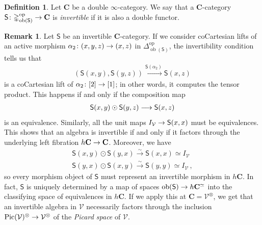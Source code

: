 \documentclass[10pt]{amsart}
\numberwithin{equation}{section}
\theoremstyle{definition}
\newtheorem{definition}[prop]{Definition}
\newtheorem{rem}[prop]{Remark}
\DeclareMathOperator{\Pic}{Pic}
\DeclareMathOperator{\ob}{ob}
\DeclareMathOperator{\op}{op}
\newcommand{\Simp}{\mathbb{\Delta}}
\newcommand{\cV}{\mathcal{V}}
\newcommand{\bfC}{\mathbf{C}}
\newcommand{\sfS}{\mathsf{S}}
\renewcommand{\to}{\mathchoice{\longrightarrow}{\rightarrow}{}{}}
\begin{document}
	\begin{definition}\label{def:invertible_alg}
		Let $\bfC$ be a double $\infty$-category.
    We say that a $\bfC$-category $\sfS \colon \Simp^{\op}_{\ob(\sfS)} \to \bfC$ is \emph{invertible} if it is also a double functor.
	\end{definition}

	\begin{rem}\label{rem:unwinding_invertible_alg}
		Let $\sfS$ be an invertible $\bfC$-category.
		If we consider coCartesian lifts of an active morphism $\alpha_2 \colon (x,y,z) \to (x,z)$ in $\Simp^{\op}_{\ob(\sfS)}$, the invertibility condition tells us that
		\begin{align*}
			\left(\sfS(x,y), \sfS(y,z) \right) \xrightarrow{\sfS(\alpha_2)} \sfS(x,z)
		\end{align*}
		is a coCartesian lift of $\alpha_{2}\colon [2] \to [1]$; in other words, it computes the tensor product.
		This happens if and only if the composition map
		\begin{align*}
			\sfS(x,y)\odot \sfS(y,z) \to \sfS(x,z)
		\end{align*}
		is an equivalence.
		Similarly, all the unit maps $I_{\cV}\to \sfS(x,x)$ must be equivalences.
		This shows that an algebra is invertible if and only if it factors through the underlying left fibration $h\bfC \to \bfC$.
		Moreover, we have
		\begin{align*}
			\sfS(x,y) \odot \sfS(y,x) \xrightarrow{\sim} \sfS(x,x) \simeq I_{\cV} \\
			\sfS(y,x) \odot \sfS(x,y) \xrightarrow{\sim} \sfS(y,y) \simeq I_{\cV} \, ,
		\end{align*}
		so every morphism object of $\sfS$ must represent an invertible morphism in $h\bfC$.
    In fact, $\sfS$ is uniquely determined by a map of spaces $\ob(\sfS) \to h\bfC^{\simeq}$ into the classifying space of equivalences in $h\bfC$.
    If we apply this at $\bfC= \cV^{\otimes}$, we get that an invertible algebra in $\cV$ necessarily factors through the inclusion $\Pic(\cV)^{\otimes}\to \cV^{\otimes}$ of the \emph{Picard space} of $\cV$.
	\end{rem}
\end{document}
